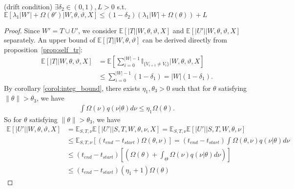 \begin{lemma}(drift condition) $\exists \delta_2 \in (0, 1), L > 0$
  s.t.
  $\mathbb{E}\left[\lambda_1|W'| + \Omega(\theta')  | W, \theta, \vartheta, X\right]
  \leq (1 - \delta_2)\left(\lambda_1|W| + \Omega(\theta)   \right) + L$ %
\label{lem:drift}
\end{lemma}
\begin{proof}
Since $W'=T\cup U'$, we consider $\mathbb{E}[|T| |W,\theta,\vartheta,X]$
and $\mathbb{E}[|U'| | W, \theta, \vartheta, X]$ separately.
An upper bound of $\mathbb{E}[|T| | W,\theta,\vartheta]$ can be derived
directly from proposition~\ref{prop:self_tr}:
\begin{align*}
\mathbb{E}[|T| |W,\theta,\vartheta,X] &= \mathbb{E}[\sum_{i = 0}^{|W|-1}
  \mathbb{I}_{\{ V_{i + 1} \neq V_i \}}| W, \theta, \vartheta, X]\\
&\leq \sum_{i = 0}^{|W| - 1} (1 - \delta_1) = |W|(1 - \delta_1).
\end{align*}
By corollary \ref{corol:integ_bound}, there exists $\eta_1 , \theta_3 > 0$ such that for $\theta$  satisfying $ \parallel \theta \parallel > \theta_3$, we have
\begin{align*}
\int \Omega(\nu) q(\nu | \theta)d\nu \leq \eta_1 \Omega(\theta).
\end{align*}
So for $\theta$ satisfying $ \parallel \theta \parallel > \theta_3$, we have
\begin{align*}
\mathbb{E}[|U'| |W, \theta, \vartheta, X] &= \mathbb{E}_{S,T, \nu}\mathbb{E}[|U'| | S, T, W, \theta, \nu, X] = \mathbb{E}_{S,T, \nu}\mathbb{E}[|U'| | S, T, W, \theta, \nu] \\
& \leq \mathbb{E}_{S,T, \nu} \left[(t_{end} - t_{start})\Omega(\theta, \nu)\right] = (t_{end} - t_{start})\int \Omega(\theta, \nu) q(\nu | \theta) d\nu\\
& \leq (t_{end} - t_{start})\left[ \left(  \Omega(\theta) +
\int_\Theta \Omega(\nu) q(\nu | \theta)d\nu \right) \right] \\
& \leq (t_{end} - t_{start}) (\eta_1 + 1) \Omega(\theta) %
\end{align*}



\end{proof}
